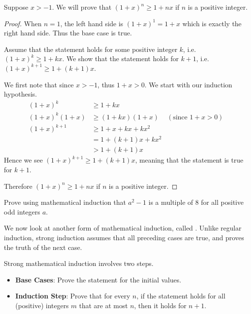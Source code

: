\begin{example}
    Suppose $x > -1$. We will prove that $(1+x)^n \geq 1+nx$ if $n$ is a positive integer.
    \begin{proof}
        When $n = 1$, the left hand side is $(1+x)^1 = 1+x$ which is exactly the right hand side. Thus the base case is true.

        Assume that the statement holds for some positive integer $k$, i.e. $(1+x)^k \geq 1+kx$. We show that the statement holds for $k+1$, i.e. $(1+x)^{k+1} \geq 1+(k+1)x$.

        We first note that since $x>-1$, thus $1+x > 0$. We start with our induction hypothesis.
        \begin{align*}
            (1+x)^k &\geq 1+kx\\
            (1+x)^k(1+x) &\geq (1+kx)(1+x) & (\text{since }1+x > 0)\\
            (1+x)^{k+1} &\geq 1 + x + kx + kx^2\\
            &= 1+(k+1)x + kx^2\\
            &> 1+(k+1)x
        \end{align*}
        Hence we see $(1+x)^{k+1} \geq 1+(k+1)x$, meaning that the statement is true for $k+1$.

        Therefore $(1+x)^n \geq 1+nx$ if $n$ is a positive integer.
    \end{proof}
\end{example}

\begin{exercise}
    Prove using mathematical induction that $a^2 - 1$ is a multiple of 8 for all positive odd integers $a$.
\end{exercise}

We now look at another form of mathematical induction, called . Unlike regular induction, strong induction assumes that all preceding cases are true, and proves the truth of the next case.

Strong mathematical induction involves two steps.
\begin{itemize}
    \item \textbf{Base Cases}: Prove the statement for the initial values.
    \item \textbf{Induction Step}: Prove that for every $n$, if the statement holds for all (positive) integers $m$ that are at most $n$, then it holds for $n + 1$.
\end{itemize}

